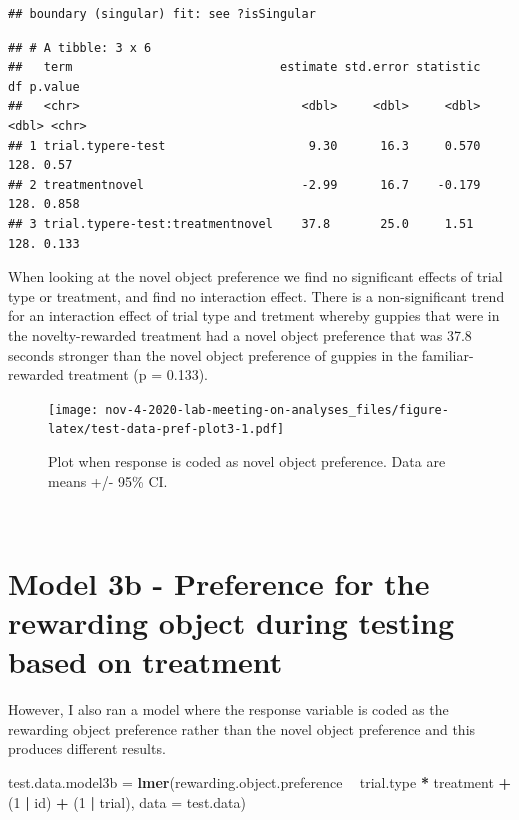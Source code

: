 \documentclass[]{book}
\newenvironment{Shaded}{\begin{snugshade}}{\end{snugshade}}
\newcommand{\KeywordTok}[1]{\textcolor[rgb]{0.13,0.29,0.53}{\textbf{#1}}}
\newcommand{\DataTypeTok}[1]{\textcolor[rgb]{0.13,0.29,0.53}{#1}}
\newcommand{\DecValTok}[1]{\textcolor[rgb]{0.00,0.00,0.81}{#1}}
\newcommand{\StringTok}[1]{\textcolor[rgb]{0.31,0.60,0.02}{#1}}
\newcommand{\OperatorTok}[1]{\textcolor[rgb]{0.81,0.36,0.00}{\textbf{#1}}}
\newcommand{\NormalTok}[1]{#1}
\begin{document}
\begin{verbatim}
## boundary (singular) fit: see ?isSingular
\end{verbatim}

\begin{verbatim}
## # A tibble: 3 x 6
##   term                             estimate std.error statistic    df p.value
##   <chr>                               <dbl>     <dbl>     <dbl> <dbl> <chr>  
## 1 trial.typere-test                    9.30      16.3     0.570  128. 0.57   
## 2 treatmentnovel                      -2.99      16.7    -0.179  128. 0.858  
## 3 trial.typere-test:treatmentnovel    37.8       25.0     1.51   128. 0.133
\end{verbatim}

When looking at the novel object preference we find no significant
effects of trial type or treatment, and find no interaction effect.
There is a non-significant trend for an interaction effect of trial type
and tretment whereby guppies that were in the novelty-rewarded treatment
had a novel object preference that was 37.8 seconds stronger than the
novel object preference of guppies in the familiar-rewarded treatment (p
= 0.133).

\begin{figure}
\centering
\texttt{[image: nov-4-2020-lab-meeting-on-analyses\_files/figure-latex/test-data-pref-plot3-1.pdf]}
\caption{\label{fig:test-data-pref-plot3}Plot when response is coded as
novel object preference. Data are means +/- 95\% CI.}
\end{figure}

~

\chapter{Model 3b - Preference for the rewarding object during testing
based on
treatment}\label{model-3b---preference-for-the-rewarding-object-during-testing-based-on-treatment}

However, I also ran a model where the response variable is coded as the
rewarding object preference rather than the novel object preference and
this produces different results.

\begin{Shaded}
\begin{Highlighting}[]
\NormalTok{test.data.model3b =}\StringTok{ }
\StringTok{  }\KeywordTok{lmer}\NormalTok{(rewarding.object.preference }\OperatorTok{~}\StringTok{  }\NormalTok{trial.type }\OperatorTok{*}\StringTok{ }\NormalTok{treatment }\OperatorTok{+}\StringTok{ }\NormalTok{(}\DecValTok{1} \OperatorTok{|}\StringTok{ }\NormalTok{id) }\OperatorTok{+}\StringTok{ }\NormalTok{(}\DecValTok{1} \OperatorTok{|}\StringTok{ }\NormalTok{trial), }
       \DataTypeTok{data =}\NormalTok{ test.data)}
\end{Highlighting}
\end{Shaded}
\end{document}
